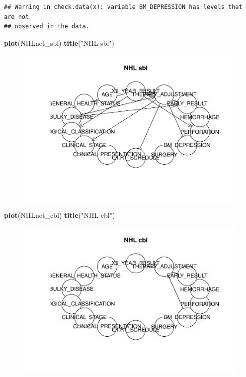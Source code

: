 \documentclass[]{article}
\newenvironment{Shaded}{\begin{snugshade}}{\end{snugshade}}
\newcommand{\KeywordTok}[1]{\textcolor[rgb]{0.13,0.29,0.53}{\textbf{{#1}}}}
\newcommand{\StringTok}[1]{\textcolor[rgb]{0.31,0.60,0.02}{{#1}}}
\newcommand{\NormalTok}[1]{{#1}}
\begin{document}
\begin{verbatim}
## Warning in check.data(x): variable BM_DEPRESSION has levels that are not
## observed in the data.
\end{verbatim}

\begin{Shaded}
\begin{Highlighting}[]
\KeywordTok{plot}\NormalTok{(NHLnet_sbl)}
\KeywordTok{title}\NormalTok{(}\StringTok{"NHL sbl"}\NormalTok{)}
\end{Highlighting}
\end{Shaded}

\begin{figure}[htbp]
\centering
\includegraphics{BN_Ass2_files/figure-latex/unnamed-chunk-5-1.pdf}
\end{figure}

\begin{Shaded}
\begin{Highlighting}[]
\KeywordTok{plot}\NormalTok{(NHLnet_cbl)}
\KeywordTok{title}\NormalTok{(}\StringTok{"NHL cbl"}\NormalTok{)}
\end{Highlighting}
\end{Shaded}

\begin{figure}[htbp]
\centering
\includegraphics{BN_Ass2_files/figure-latex/unnamed-chunk-5-2.pdf}
\end{figure}
\end{document}
